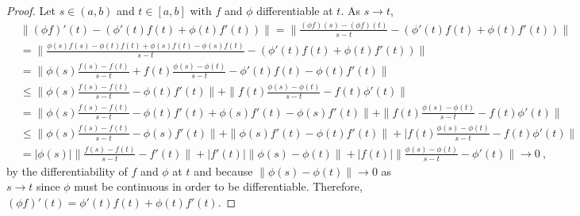 \begin{questions}


\begin{solution}
  \begin{proof}
Let $s \in (a,b)$ and $t \in [a,b]$ with $f$ and $\phi$ differentiable at $t$. As $s \rightarrow t$,
\begin{align*}
&\|(\phi f)'(t) - (\phi'(t) f(t) + \phi (t)f'(t))\| =  \| \frac{(\phi f)(s) - (\phi f)(t)}{s - t} - (\phi'(t) f(t) + \phi (t)f'(t))\| \\
&= \| \frac{\phi(s)f(s) - \phi(t)f(t) + \phi(s)f(t) - \phi(s)f(t)}{s-t} - (\phi'(t) f(t) + \phi (t)f'(t)) \| \\
& = \| \phi(s) \frac{f(s) - f(t)}{s-t} + f(t) \frac{\phi(s) - \phi(t)}{s-t} - \phi'(t) f(t) - \phi (t)f'(t) \| \\
& \leq \|\phi(s) \frac{f(s) - f(t)}{s-t} - \phi(t)f'(t) \| + \| f(t) \frac{\phi(s) - \phi(t)}{s-t} - f(t) \phi'(t) \| \\
& = \|\phi(s) \frac{f(s) - f(t)}{s-t} - \phi(t)f'(t) + \phi(s)f'(t) - \phi(s)f'(t) \| + \| f(t) \frac{\phi(s) - \phi(t)}{s-t} - f(t) \phi'(t) \| \\
& \leq \| \phi(s) \frac{f(s) - f(t)}{s-t} - \phi(s)f'(t) \| + \| \phi(s)f'(t) - \phi(t)f'(t)\| + | f(t) \frac{\phi(s) - \phi(t)}{s-t} - f(t) \phi'(t) \| \\
&= |\phi(s)| \|\frac{f(s) - f(t)}{s-t} - f'(t) \| + |f'(t)| \|\phi(s) - \phi(t) \| + |f(t)| \|\frac{\phi(s) - \phi(t)}{s-t} - \phi'(t) \|  \rightarrow 0~,
\end{align*}
by the differentiability of $f$ and $\phi$ at $t$ and because $\|\phi(s) - \phi(t)\| \rightarrow 0$ as $s \rightarrow t$ since $\phi$ must be continuous in order to be differentiable. Therefore, $(\phi f)'(t) = \phi'(t)f(t) + \phi (t)f'(t)$.

\end{proof}
\end{solution}
\end{questions}
